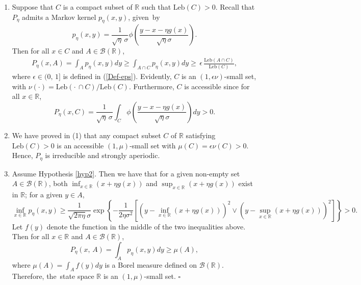 \documentclass[11pt]{elsarticle}
\def\geq{\geqslant}
\def\R{\mathbb{R}}
\begin{document}
\begin{pf}
	\begin{enumerate}
	\item[(1)] 	Suppose that $C$ is a compact subset of $\mathbb{R}$ such that $\mbox{Leb}(C)>0$. Recall that $P_{\eta}$ admits a Markov kernel $p_{\eta}(x,y)$, given~by
	$$p_{\eta}(x,y)=\frac{1}{\sqrt{\eta}\,\sigma}\phi\left(\frac{y-x-\eta g(x)}{\sqrt{\eta}\sigma} \right).$$
	Then for all $x\in C$ and $A\in\mathcal{B}(\R)$,		
	\begin{align*}
			P_{\eta}(x,A)=\int_A p_{\eta}(x,y) dy\geq\int_{A\cap C}p_{\eta}(x,y) dy\geq\,\epsilon\, \frac{\mbox{Leb}(A\cap C)}{\mbox{Leb}(C)},
	\end{align*}
	where $\epsilon\in(0,\,1]$ is defined in (\ref{Def-eps}). Evidently, $C$ is an $(1,\epsilon\nu)$-small set, with $\nu(\cdot)=\mbox{Leb}(\cdot\,\cap C)/\mbox{Leb}(C)$. Furthermore, $C$ is accessible since for all $x\in\R$,
	$$P_{\eta}(x,C)=\frac{1}{\sqrt{\eta}\,\sigma}\int_C\phi\left(\frac{y-x-\eta g(x)}{\sqrt{\eta}\sigma}\right)dy>0.$$
	\item[(2)] We have proved in (1) that any compact subset $C$ of $\R$ satisfying $\mbox{Leb}(C)>0$ is an accessible $(1,\mu)$-small set with $\mu(C)=\epsilon\nu(C)>0$. Hence, $P_{\eta}$ is irreducible and strongly aperiodic.
	\item[(3)] Assume Hypothesis \ref{hyp2}. Then we have that for a given non-empty set $A\in\mathcal{B}(\R)$, both $\inf_{x\in\R}(x+\eta g(x))$ and $\sup_{x\in\R}(x+\eta g(x))$ exist in $\R$; for a given $y\in A$,	
		$$
		\inf_{x\in\R}p_{\eta}(x,y)\geq\frac{1}{\sqrt{2\pi\eta}\sigma}\exp\left\{-\frac{1}{2\eta\sigma^2}\left[\left(y-\inf_{x\in\R}(x+\eta g(x))\right)^2\vee\left(y-\sup_{x\in\R}(x+\eta g(x))\right)^2\right]\right\}>0.
		$$
      Let $f(y)$ denote the function in the middle of the two inequalities above. Then for all $x\in\R$ and $A\in\mathcal{B}(\R)$,
      $$P_{\eta}(x,\,A)=\int_A p_{\eta}(x,y) dy\geq\mu(A),$$
      where $\mu(A)=\int_A f(y) dy$ is a Borel measure defined on $\mathcal{B}(\R)$. Therefore, the~state space $\R$ is an $(1,\mu)$-small set. \hfill$\square$
\end{enumerate}
\end{pf}
\end{document}
